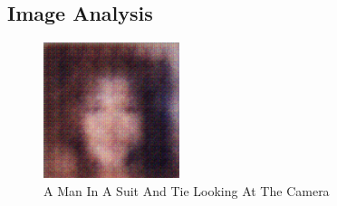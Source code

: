 \documentclass{article}%
\begin{document}
%
\subsection{Image Analysis}%
\label{subsec:ImageAnalysis}%


\begin{figure}[h!]%
\centering%
\includegraphics[width=150px]{500_fake_images/samples_5_406.png}%
\caption{A Man In A Suit And Tie Looking At The Camera}%
\end{figure}

%
\end{document}
